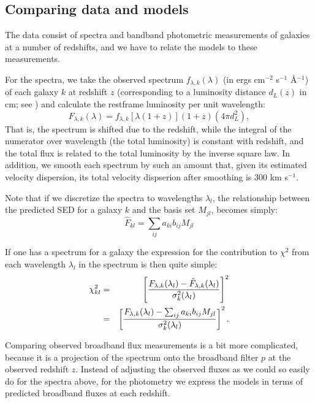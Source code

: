 \documentclass[10pt,preprint]{aastex}
\begin{document}
\subsection{Comparing data and models}

The data consist of spectra and bandband photometric measurements of
galaxies at a number of redshifts, and we have to relate the models to
these measurements.

For the spectra, we take the observed spectrum
$f_{\lambda,k}(\lambda)$ (in ergs cm$^{-2}$ s$^{-1}$ \AA$^{-1}$) of
each galaxy $k$ at redshift $z$ (corresponding to a luminosity
distance $d_L(z)$ in cm; see \citealt{hogg99a}) and calculate the
restframe luminosity per unit wavelength:
\begin{equation}
{{F}}_{\lambda, k}(\lambda) = 
{{f}}_{\lambda, k}[\lambda (1+z)](1+z) (4 \pi d_L^2),
\end{equation}
That is, the spectrum is shifted due to the redshift, while the
integral of the numerator over wavelength (the total luminosity) is
constant with redshift, and the total flux is related to the total
luminosity by the inverse square law.  In addition, we smooth each
spectrum by such an amount that, given its estimated velocity
dispersion, its total velocity dispserion after smoothing is 300 km
s$^{-1}$.

Note that if we discretize the spectra to wavelengths $\lambda_l$, the
relationship between the predicted SED for a galaxy $k$ and the basis
set $M_{jl}$, becomes simply:
\begin{equation}
\hat{F}_{kl} = \sum_{ij} a_{ki} b_{ij} M_{jl}
\end{equation}

If one has a spectrum for a galaxy the
expression for the contribution to $\chi^2$ from each wavelength
$\lambda_l$ in the spectrum is then quite simple:
\begin{eqnarray}
\label{chi2spec}
\chi_{kl}^2 &=& \left[\frac{F_{\lambda,k}(\lambda_l) -
{\hat{F}}_{\lambda,k}(\lambda_l)} 
{\sigma^2_k(\lambda_l)}\right]^2 \cr
&=&
\left[\frac{F_{\lambda,k}(\lambda_l) -
\sum_{ij} a_{ki} b_{ij} M_{jl}
}{\sigma^2_k(\lambda_l)}\right]^2. 
\end{eqnarray}

Comparing observed broadband flux measurements is a bit more
complicated, because it is a projection of the spectrum onto the
broadband filter $p$ at the observed redshift $z$. Instead of
adjusting the observed fluxes as we could so easily do for the spectra
above, for the photometry we express the models in terms of predicted
broadband fluxes at each redshift.
\end{document}
